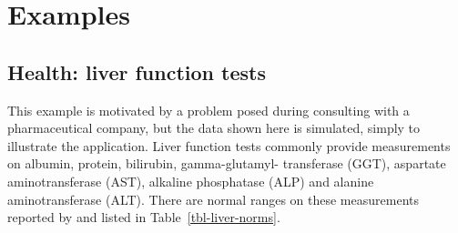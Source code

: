\documentclass[
  12pt]{article}
\begin{document}
\section{Examples}\label{sec-examples}

\subsection{Health: liver function
tests}\label{health-liver-function-tests}

This example is motivated by a problem posed during consulting with a
pharmaceutical company, but the data shown here is simulated, simply to
illustrate the application. Liver function tests commonly provide
measurements on albumin, protein, bilirubin, gamma-glutamyl- transferase
(GGT), aspartate aminotransferase (AST), alkaline phosphatase (ALP) and
alanine aminotransferase (ALT). There are normal ranges on these
measurements reported by \citet{lib-med-liver-norms} and listed in
Table~\ref{tbl-liver-norms}.
\end{document}
